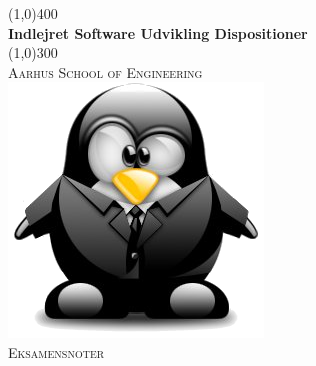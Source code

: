 
\newcommand{\myTitle}{Indlejret Software Udvikling Dispositioner}


\begin{titlepage}
	
	\begin{center}
		\line(1,0){400} \\
		[0.5cm]
		\huge{\bfseries \myTitle} \\
		[0cm]
		\line(1,0){300} \\
		[1.5cm]
		\textsc{\LARGE Aarhus School of Engineering} \\
		[1cm]
		\includegraphics[width=0.4\linewidth]{figs/tux} \\
		[0.1cm]
		\textsc{\large Eksamensnoter} \\
	\end{center}
	
\end{titlepage}